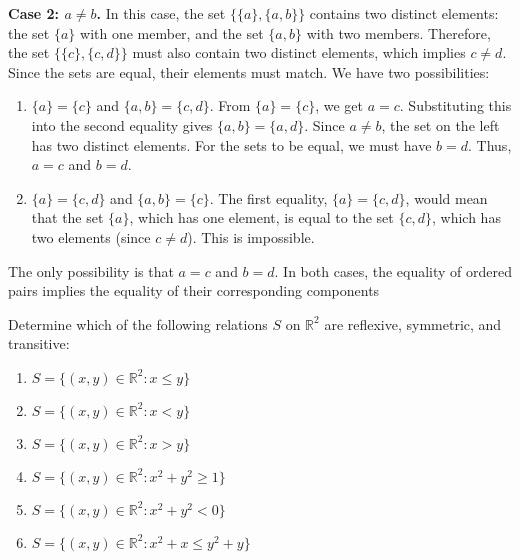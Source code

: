 \textbf{Case 2: $a \neq b$.}
In this case, the set $\{\{a\}, \{a, b\}\}$ contains two distinct elements: the set $\{a\}$ with one member, and the set $\{a, b\}$ with two members. Therefore, the set $\{\{c\}, \{c, d\}\}$ must also contain two distinct elements, which implies $c \neq d$.
Since the sets are equal, their elements must match. We have two possibilities:
\begin{enumerate}
\item $\{a\} = \{c\}$ and $\{a, b\} = \{c, d\}$.
From $\{a\} = \{c\}$, we get $a=c$. Substituting this into the second equality gives $\{a, b\} = \{a, d\}$. Since $a \neq b$, the set on the left has two distinct elements. For the sets to be equal, we must have $b=d$. Thus, $a=c$ and $b=d$.
\item $\{a\} = \{c, d\}$ and $\{a, b\} = \{c\}$.
The first equality, $\{a\} = \{c, d\}$, would mean that the set $\{a\}$, which has one element, is equal to the set $\{c, d\}$, which has two elements (since $c \neq d$). This is impossible.
\end{enumerate}
The only possibility is that $a=c$ and $b=d$. In both cases, the equality of ordered pairs implies the equality of their corresponding components

\begin{problembox}
Determine which of the following relations $S$ on $\mathbb{R}^2$ are reflexive, symmetric, and transitive:
\begin{enumerate}[label=(\alph*)]
\item $S = \{(x,y) \in \mathbb{R}^2 : x \leq y\}$
\item $S = \{(x,y) \in \mathbb{R}^2 : x < y\}$
\item $S = \{(x,y) \in \mathbb{R}^2 : x > y\}$
\item $S = \{(x,y) \in \mathbb{R}^2 : x^2 + y^2 \geq 1\}$
\item $S = \{(x,y) \in \mathbb{R}^2 : x^2 + y^2 < 0\}$
\item $S = \{(x,y) \in \mathbb{R}^2 : x^2 + x \leq y^2 + y\}$
\end{enumerate}
\end{problembox}

